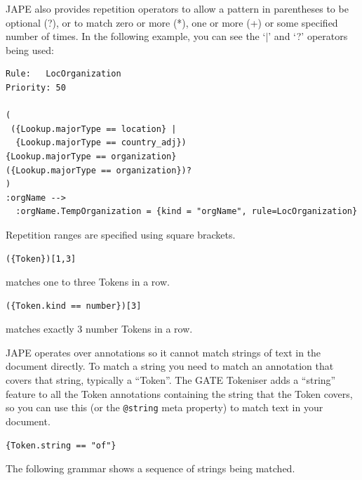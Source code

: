 
JAPE also provides repetition operators to allow a pattern in parentheses to be
optional (?), or to match zero or more (*), one or more (+) or some specified
number of times.  In the following example, you can see the `$\mid $' and `?'
operators being used: 
\begin{small}
\begin{verbatim}
Rule:	LocOrganization
Priority: 50

(
 ({Lookup.majorType == location} |
  {Lookup.majorType == country_adj})
{Lookup.majorType == organization}
({Lookup.majorType == organization})?
)
:orgName -->  
  :orgName.TempOrganization = {kind = "orgName", rule=LocOrganization}
\end{verbatim}
\end{small}


Repetition ranges are specified using square brackets.
\begin{small}
\begin{verbatim}({Token})[1,3]\end{verbatim}
\end{small} matches one to three Tokens 
in a row. \begin{small}
\begin{verbatim}({Token.kind == number})[3]\end{verbatim}
\end{small} matches
exactly 3 number Tokens in a row.


JAPE operates over annotations so it cannot match strings of text in the
document directly.  To match a string you need to match an annotation that
covers that string, typically a ``Token''.  The GATE Tokeniser adds a
``string'' feature to all the Token annotations containing the string that the
Token covers, so you can use this (or the \verb|@string| meta property) to
match text in your document.

\begin{small}
\begin{verbatim}
{Token.string == "of"}
\end{verbatim}
\end{small}

The following grammar shows a sequence of strings being matched.

